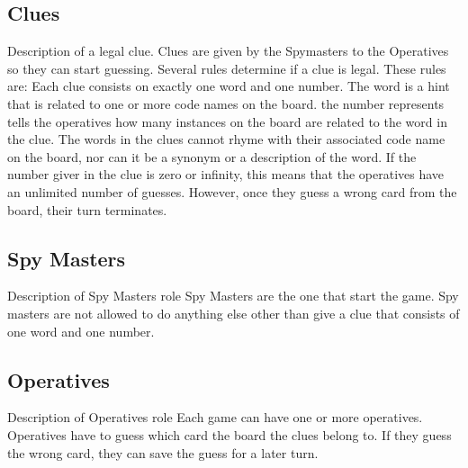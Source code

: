 \documentclass[12pt]{article}
\begin{document}
\newpage

\subsection{Clues}
Description of a legal clue. \newline
Clues are given by the Spymasters to the Operatives so they can start guessing. Several rules determine if a clue is legal. These rules are:
Each clue consists on exactly one word and one number. The word is a hint that is related to one or more code names on the board. the number represents tells the operatives how many instances on the board are related to the word in the clue. \newline
The words in the clues cannot rhyme with their associated code name on the board, nor can it be a synonym or a description of the word. \newline
If the number giver in the clue is zero or infinity, this means that the operatives have an unlimited number of guesses. However, once they guess a wrong card from the board, their turn terminates.\newline

\subsection{Spy Masters}
Description of Spy Masters role\newline
Spy Masters are the one that start the game. 
Spy masters are not allowed to do anything else other than give a clue that consists of one word and one number.

\subsection{Operatives}
Description of Operatives role\newline
Each game can have one or more operatives. Operatives have to guess which card the board the clues belong to. If they guess the wrong card, they can save the guess for a later turn. 
\end{document}
